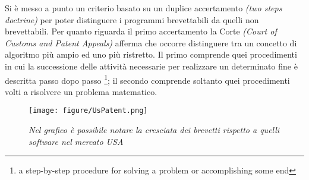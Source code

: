Si è messo a punto un criterio basato su un duplice accertamento \textit{(two steps doctrine)} per poter distinguere i programmi brevettabili da quelli non brevettabili. Per quanto riguarda il primo accertamento la Corte \textit{(Court of Customs and Patent Appeals)} afferma che occorre distinguere tra un concetto di algoritmo più ampio ed uno più ristretto. Il primo comprende quei procedimenti in cui la successione delle attività necessarie per realizzare un determinato fine è descritta passo dopo passo \footnote{a step-by-step procedure for solving a problem or accomplishing some end}; il secondo comprende soltanto quei procedimenti volti a risolvere un problema matematico.




\begin{figure}[bh]
	\begin{center}
		\texttt{[image: figure/UsPatent.png]}
	\end{center}
	\caption{\textit{Nel grafico è possibile notare la cresciata dei brevetti rispetto a quelli software nel mercato USA}}
\end{figure}


